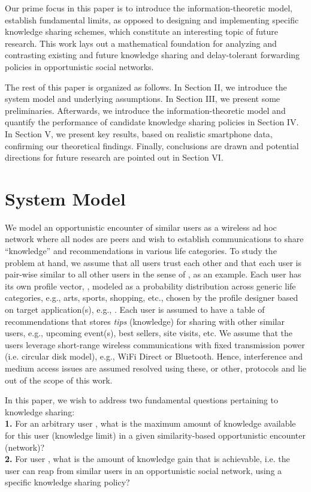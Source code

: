 \documentclass[conference]{IEEEtran}
\theoremstyle{definition}
\begin{document}
Our prime focus in this paper is to introduce the information-theoretic model, establish fundamental limits, as opposed to designing and implementing specific knowledge sharing schemes, which constitute an interesting topic of future research. This work lays out a 
mathematical foundation for analyzing and contrasting existing and future 
knowledge sharing and delay-tolerant forwarding policies in opportunistic social networks.


The rest of this paper is organized as follows. In Section II, we introduce 
the system model and underlying assumptions. In Section III, we present
some preliminaries. Afterwards, we introduce the information-theoretic model 
and quantify the performance of candidate knowledge sharing policies in Section IV. 
In Section V, we present key results, based on realistic smartphone data, confirming 
our theoretical findings. Finally, conclusions are drawn and potential directions for 
future research are pointed out in Section VI.
\vspace{-0.1 cm}
\section{System Model}
\vspace{-0.1 cm}  
We model an opportunistic encounter of  similar users as a wireless ad hoc network where 
all nodes are peers and wish to establish communications to share ``knowledge'' and recommendations in various life categories. To study the problem at hand, we assume that all users trust each other and that each user is pair-wise similar to all other users in the sense of \cite{mai14}, as an example. Each user has its own profile vector, , modeled as a probability distribution across  generic life categories, e.g., arts, sports, shopping, etc., chosen by the profile designer based on target application(s), e.g., \cite{odp}. Each user is assumed to have a table of recommendations that stores \textit{tips} (knowledge) for sharing with other similar users, e.g., upcoming event(s), best sellers, site visits, etc. We assume that the users leverage short-range wireless communications with fixed transmission power (i.e. circular disk model), e.g., WiFi Direct or Bluetooth. Hence, interference and medium access issues are assumed resolved using these, or other, protocols and lie out of the scope of this work.

In this paper, we wish to address two fundamental questions pertaining to knowledge sharing:\\
{\bf 1.} For an arbitrary user , what is the maximum amount of knowledge available for this user (knowledge limit) in a given similarity-based opportunistic encounter (network)?\\
{\bf 2.} For user , what is the amount of knowledge gain that is achievable, i.e. the user can reap from similar users in an opportunistic social network, using a specific knowledge sharing policy?
\end{document}
